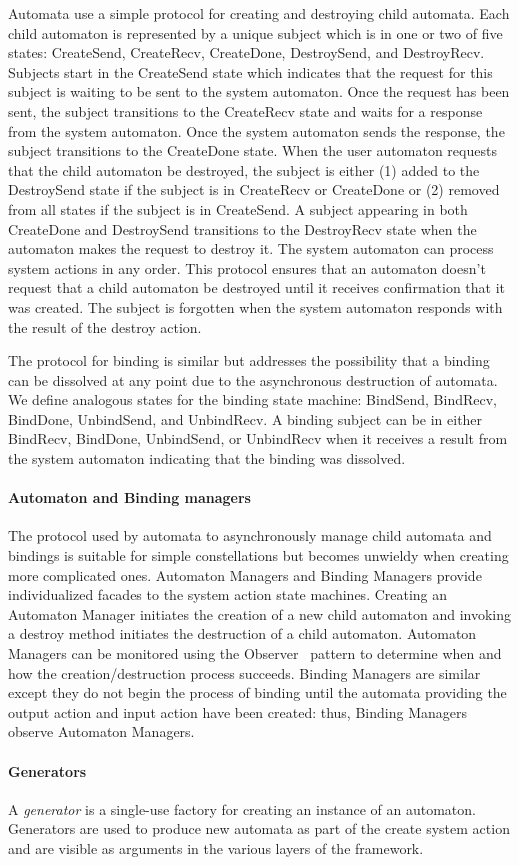 Automata use a simple protocol for creating and destroying child automata.
Each child automaton is represented by a unique subject which is in one or two of five states: CreateSend, CreateRecv, CreateDone, DestroySend, and DestroyRecv.
Subjects start in the CreateSend state which indicates that the request for this subject is waiting to be sent to the system automaton.
Once the request has been sent, the subject transitions to the CreateRecv state and waits for a response from the system automaton.
Once the system automaton sends the response, the subject transitions to the CreateDone state.
When the user automaton requests that the child automaton be destroyed, the subject is either (1) added to the DestroySend state if the subject is in CreateRecv or CreateDone or (2) removed from all states if the subject is in CreateSend.
A subject appearing in both CreateDone and DestroySend transitions to the DestroyRecv state when the automaton makes the request to destroy it.
The system automaton can process system actions in any order.
This protocol ensures that an automaton doesn't request that a child automaton be destroyed until it receives confirmation that it was created.
The subject is forgotten when the system automaton responds with the result of the destroy action.

The protocol for binding is similar but addresses the possibility that a binding can be dissolved at any point due to the asynchronous destruction of automata.
We define analogous states for the binding state machine: BindSend, BindRecv, BindDone, UnbindSend, and UnbindRecv.
A binding subject can be in either BindRecv, BindDone, UnbindSend, or UnbindRecv when it receives a result from the system automaton indicating that the binding was dissolved.

\paragraph*{Automaton and Binding managers}
The protocol used by automata to asynchronously manage child automata and bindings is suitable for simple constellations but becomes unwieldy when creating more complicated ones.
Automaton Managers and Binding Managers provide individualized facades to the system action state machines.
Creating an Automaton Manager initiates the creation of a new child automaton and invoking a destroy method initiates the destruction of a child automaton.
Automaton Managers can be monitored using the Observer~\cite{gamma1995design} pattern to determine when and how the creation/destruction process succeeds.
Binding Managers are similar except they do not begin the process of binding until the automata providing the output action and input action have been created: thus, Binding Managers observe Automaton Managers.

\ifjournal
\paragraph*{Generators}
A \emph{generator} is a single-use factory for creating an instance of an automaton.
Generators are used to produce new automata as part of the create system action and are visible as arguments in the various layers of the framework.
\fi
